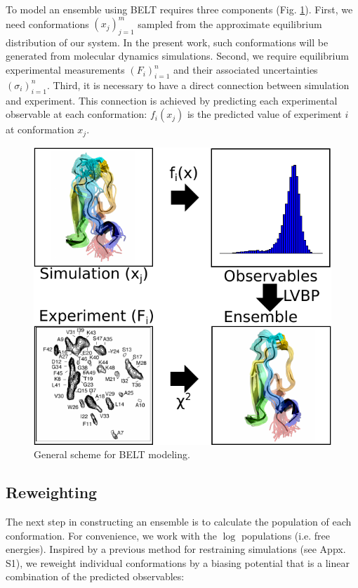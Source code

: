 \documentclass[11pt,titlepage]{article}
\begin{document}
To model an ensemble using BELT requires three components (Fig. \ref{figure:BELT}).  First, we need conformations $(x_j)_{j=1}^{m}$ sampled from the approximate equilibrium distribution of our system.  In the present work, such conformations will be generated from molecular dynamics simulations.  Second, we require equilibrium experimental measurements $(F_i)_{i=1}^n$ and their associated uncertainties $(\sigma_i)_{i=1}^{n}$.  Third, it is necessary to have a direct connection between simulation and experiment.  This connection is achieved by predicting each experimental observable at each conformation: $f_i(x_j)$ is the predicted value of experiment $i$ at conformation $x_j$.  

\begin{figure}

\includegraphics[width=16.0cm]{figures/info_graphic/info_graphic.pdf}

\caption{
General scheme for BELT modeling.
}
\label{figure:BELT}
\end{figure}

\subsection*{Reweighting}

The next step in constructing an ensemble is to calculate the population of each conformation.  For convenience, we work with the $\log$ populations (i.e. free energies). Inspired by a previous method for restraining simulations \citep{chodera2012} (see Appx. S1), we reweight individual conformations by a biasing potential that is a linear combination of the predicted observables:
\end{document}
